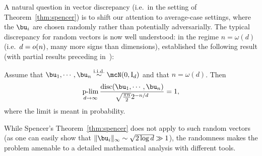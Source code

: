\noindent
A natural question in vector discrepancy (i.e.\ in the setting of Theorem~\ref{thm:spencer}) is to shift our attention to average-case settings, where the $\bu_i$ are 
chosen randomly rather than potentially adversarially.
The typical discrepancy for random vectors is now well understood: in the regime $n = \omega(d)$ (i.e.\ $d = o(n)$, many more signs than dimensions), 
\cite{turner2020balancing} established the following result (with partial results preceding in~\cite{karmarkar1986probabilistic,costello2009balancing}):
\begin{theorem}\label{thm:rvector_disc}
    Assume that $\bu_1, \cdots, \bu_n \iid \mcN(0, \Id_d)$ and that $n = \omega(d)$.
    Then  
    \begin{align*}
        \plim_{d \to \infty} \frac{\disc(\bu_1, \cdots, \bu_n)}{\sqrt{\frac{\pi n}{2}} 2^{-n/d}} = 1,
    \end{align*}
    where the limit is meant in probability.
\end{theorem}
\noindent
While Spencer's Theorem~\ref{thm:spencer} does not apply to such random vectors (as one can easily show that $\|\bu_i\|_\infty \sim \sqrt{2 \log d} \gg 1$),
the randomness makes the problem amenable to a detailed mathematical analysis with different tools.

